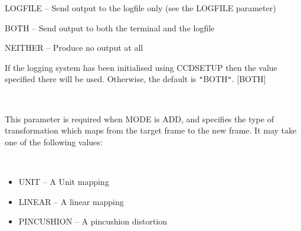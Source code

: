 \documentclass[twoside,11pt]{article}
\newcommand{\htmlref}[2]{#1}
\renewcommand{\_}{\texttt{\symbol{95}}}
\newcommand{\qt}[1]{{\tt "}#1{\tt "}}
\newcommand{\xroutine}[1]{\htmlref{{\sc #1}}{#1}}
\newcommand{\sstsubsection}[1]{ \item[{#1}] \mbox{} \\}
\newcommand{\sstitemlist}[1]{
  \mbox{} \\
  \vspace{-3.5ex}
  \begin{itemize}
     #1
  \end{itemize}
}
\newcommand{\sstitem}{\item}
\newcommand{\sstsubsection}[1]{\item[{#1}]}
\newcommand{\sstitemlist}[1]{
      \begin{itemize}
         #1
      \end{itemize}
      \\
   }
\newcommand{\sstitem}{\item}
\begin{document}
{{{{            \sstitem
               LOGFILE   -- Send output to the logfile only (see the
                               LOGFILE parameter)

            \sstitem
               BOTH      -- Send output to both the terminal and the
                               logfile

            \sstitem
               NEITHER   -- Produce no output at all

         }
         If the logging system has been initialised using \xroutine{CCDSETUP}
         then the value specified there will be used. Otherwise, the
         default is \qt{BOTH}.
         [BOTH]
      }
      \sstsubsection{
         MAPTYPE = LITERAL (Read)
      } {
         This parameter is required when MODE is ADD, and specifies the
         type of transformation which maps from the target frame to the new frame.
         It may take one of the following values:
         \sstitemlist{
            \sstitem
               UNIT       -- A Unit mapping

            \sstitem
               LINEAR     -- A linear mapping

            \sstitem
               PINCUSHION -- A pincushion distortion

}}}}
\end{document}
